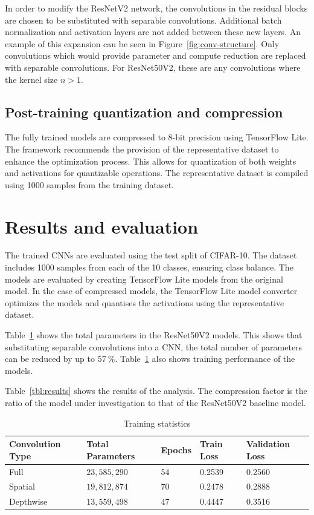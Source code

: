 \documentclass{article}
\begin{document}
	In order to modify the ResNetV2 network, the convolutions in the residual blocks are chosen to be substituted with separable convolutions. Additional batch normalization and activation layers are not added between these new layers. An example of this expansion can be seen in Figure~\ref{fig:conv-structure}. Only convolutions which would provide parameter and compute reduction are replaced with separable convolutions. For ResNet50V2, these are any convolutions where the kernel size $n > 1$. 
	
	\subsection{Post-training quantization and compression}
	The fully trained models are compressed to 8-bit precision using TensorFlow Lite. The framework recommends the provision of the representative dataset to enhance the optimization process. This allows for quantization of both weights and activations for quantizable operations. The representative dataset is compiled using 1000 samples from the training dataset. 	
	
	
	\section{Results and evaluation}
	\label{sec:results}
	
	The trained CNNs are evaluated using the test split of CIFAR-10. The dataset includes 1000 samples from each of the 10 classes, ensuring class balance. The models are evaluated by creating TensorFlow Lite models from the original model. In the case of compressed models, the TensorFlow Lite model converter optimizes the models and quantises the activations using the representative dataset. 
	
	Table~\ref{tbl:params} shows the total parameters in the ResNet50V2 models. This shows that substituting separable convolutions into a CNN, the total number of parameters can be reduced by up to $57~\%$. Table~\ref{tbl:params} also shows training performance of the models.
	
	Table~\ref{tbl:results} shows the results of the analysis. The compression factor is the ratio of the model under investigation to that of the ResNet50V2 baseline model.
	
	\begin{table}[h!]
		\caption{Training statistics}
		\label{tbl:params}
		\centering
		\begin{tabular}{lllll}
			\toprule
			Convolution Type & Total Parameters & Epochs & Train Loss & Validation Loss \\ \midrule
			Full             & $23,585,290$     & 54     & 0.2539     & 0.2560          \\
			Spatial          & $19,812,874$     & 70     & 0.2478     & 0.2888          \\
			Depthwise        & $13,559,498$     & 47     & 0.4447     & 0.3516          \\ \bottomrule
		\end{tabular}
	\end{table}
	
\end{document}
